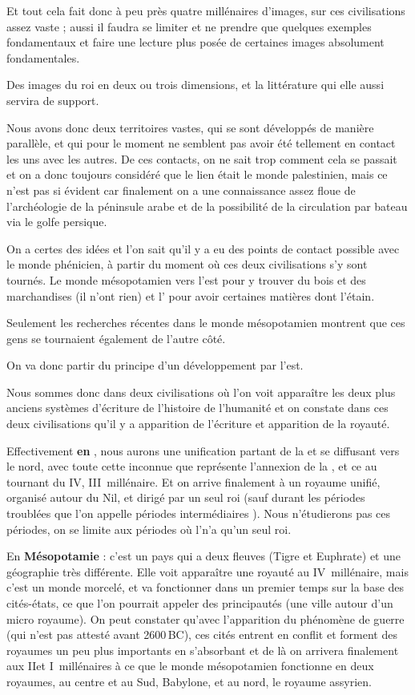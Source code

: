 \documentclass[a4paper,10pt]{article}
\begin{document}
Et tout cela fait donc à peu près quatre millénaires d'images, sur 
ces civilisations assez vaste ; aussi il faudra se limiter et ne 
prendre que quelques exemples fondamentaux et faire une lecture plus 
posée de certaines images absolument fondamentales. 

Des images du roi en deux ou trois dimensions, et la littérature qui 
elle aussi servira de support.

Nous avons donc deux territoires vastes, qui se sont développés de 
manière parallèle, et qui pour le moment ne semblent pas avoir été 
tellement en contact les uns avec les autres. De ces contacts, on ne 
sait trop comment cela se passait et on a donc toujours considéré que 
le lien était le monde palestinien, mais ce n'est pas si évident car 
finalement on a une connaissance assez floue de l'archéologie de la 
péninsule arabe et de la possibilité de la circulation par bateau 
via le golfe persique.

On a certes des idées et l'on sait qu'il y a eu des points de 
contact possible avec le monde phénicien, à partir du moment où ces 
deux civilisations s'y sont tournés. Le monde mésopotamien vers l'est 
pour y trouver du bois et des marchandises (il n'ont rien) et l'\kmt 
pour avoir certaines matières dont l'étain.

Seulement les recherches récentes dans le monde mésopotamien montrent 
que ces gens se tournaient également de l'autre côté.

On va donc partir du principe d'un développement par l'est.

Nous sommes donc dans deux civilisations où l'on voit apparaître les 
deux plus anciens systèmes d'écriture de l'histoire de l'humanité et 
on constate dans ces deux civilisations qu'il y a apparition de 
l'écriture et apparition de la royauté.

Effectivement \textbf{en \kmt}, nous aurons une unification partant 
de la \HE et se diffusant vers le nord, avec toute cette inconnue que 
représente l'annexion de la \BE, et ce au tournant du IV\ieme, 
III\ieme~millénaire. Et on arrive finalement à un royaume unifié, 
organisé autour du Nil, et dirigé par un seul roi (sauf durant les 
périodes troublées que l'on appelle \og périodes intermédiaires \fg). 
Nous n'étudierons pas ces périodes, on se limite aux périodes où 
l'\kmt n'a qu'un seul roi.

En \textbf{Mésopotamie} : c'est un pays qui a deux fleuves (Tigre et 
Euphrate) et une géographie très différente. Elle voit apparaître une 
royauté au IV\ieme~millénaire, mais c'est un monde morcelé, et va 
fonctionner dans un premier temps sur la base des cités-états, ce que 
l'on pourrait appeler des principautés (une ville autour d'un micro 
royaume). On peut constater qu'avec l'apparition du phénomène de guerre 
(qui n'est pas attesté avant 2600\,BC), ces cités entrent en conflit et 
forment des royaumes un peu plus importants en s'absorbant et de là on 
arrivera finalement aux II\ieme et I\ier~millénaires à ce que le monde 
mésopotamien fonctionne en deux royaumes, au centre et au Sud, 
Babylone, et au nord, le royaume assyrien.
\end{document}
